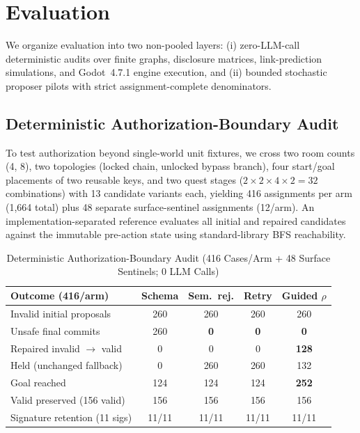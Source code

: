 \section{Evaluation}\label{sec:eval}
We organize evaluation into two non-pooled layers: (i) zero-LLM-call deterministic audits over finite graphs, disclosure matrices, link-prediction simulations, and Godot~4.7.1 engine execution, and (ii) bounded stochastic proposer pilots with strict assignment-complete denominators.

\subsection{Deterministic Authorization-Boundary Audit}
To test authorization beyond single-world unit fixtures, we cross two room counts (4, 8), two topologies (locked chain, unlocked bypass branch), four start/goal placements of two reusable keys, and two quest stages ($2{\times}2{\times}4{\times}2=32$ combinations) with 13 candidate variants each, yielding 416 assignments per arm (1,664 total) plus 48 separate surface-sentinel assignments (12/arm). An implementation-separated reference evaluates all initial and repaired candidates against the immutable pre-action state using standard-library BFS reachability.

\begin{table}[!tbp]
\caption{Deterministic Authorization-Boundary Audit (416 Cases/Arm + 48 Surface Sentinels; 0 LLM Calls)}
\label{tab:boundary-compact}
\centering
\footnotesize
\setlength{\tabcolsep}{3.5pt}
\begin{tabularx}{\columnwidth}{@{}>{\raggedright\arraybackslash}X*{4}{c}@{}}
\toprule
\textbf{Outcome (416/arm)} & \textbf{Schema} & \textbf{Sem.\ rej.} & \textbf{Retry} & \textbf{Guided $\rho$} \\
\midrule
Invalid initial proposals & 260 & 260 & 260 & 260 \\
Unsafe final commits & 260 & \textbf{0} & \textbf{0} & \textbf{0} \\
Repaired invalid $\rightarrow$ valid & 0 & 0 & 0 & \textbf{128} \\
Held (unchanged fallback) & 0 & 260 & 260 & 132 \\
Goal reached & 124 & 124 & 124 & \textbf{252} \\
Valid preserved (156 valid) & 156 & 156 & 156 & 156 \\
Signature retention (11 sigs) & 11/11 & 11/11 & 11/11 & 11/11 \\
\bottomrule
\end{tabularx}
\end{table}


